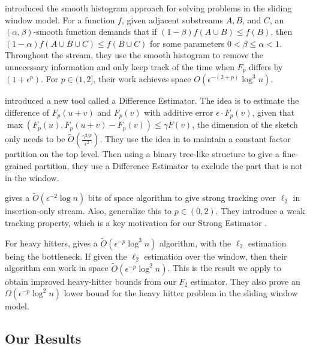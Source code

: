 \documentclass{article}
\newcommand{\est}{\textsf{Strong Estimator }}
\theoremstyle{plain}
\begin{document}
\cite{2007} introduced the smooth histogram approach for solving problems in the sliding window model. For a function $f$, given adjacent substreams $A, B$, and $C$, an $(\alpha, \beta)$-smooth function demands that if $(1-\beta) f(A \cup B) \leq f(B)$, then $(1-\alpha) f(A \cup B \cup C) \leq f(B \cup C)$ for some parameters $0<\beta \leq \alpha<1$. Throughout the stream, they use the smooth histogram to remove the  unnecessary information and only keep track of the time when $F_p$ differs by $(1 + \epsilon ^p)$. For $p\in (1, 2]$, their work achieves space $O(\epsilon ^ {-(2+p)} \log ^ 3n)$.

\cite{woodruff2022tight} introduced a new tool called a Difference Estimator. The idea is to estimate the difference of $F_p(u+v)$ and $F_p(v)$ with additive error $\epsilon \cdot F_p(v)$, given that $\max(F_p(u), F_p(u+v)-F_p(v)) \le \gamma F(v)$, the dimension of the sketch only needs to be $\tilde{O}(\frac{\gamma^{2/p}}{\epsilon ^ 2})$. They use the idea in \cite{2007} to maintain a constant factor partition on the top level. Then using a binary tree-like structure to give a fine-grained partition, they use a Difference Estimator to exclude the part that is not in the window.

\cite{braverman2017bptree} gives a $\tilde{O}(\epsilon ^ {-2} \log n)$ bits of space algorithm to give strong tracking over $\ell_2$ in insertion-only stream. Also, \cite {blasiok2017continuous} generalize this to $p\in (0, 2)$. They introduce a weak tracking property, which is a key motivation for our \est.

For heavy hitters, \cite{braverman2018nearly} gives a $\tilde{O}(\epsilon^{-p} \log ^ 3n)$ algorithm, with the $\ell_2$ estimation being the bottleneck. If given the $\ell_2$ estimation over the window, then their algorithm can work in space $\tilde{O}(\epsilon ^ {-p} \log ^ 2n)$. This is the result we apply to obtain improved heavy-hitter bounds from our $F_2$ estimator.  They also prove an $\Omega(\epsilon ^ {-p} \log ^ 2n)$ lower bound for the heavy hitter problem in the sliding window model.

\subsection{Our Results}
\end{document}
